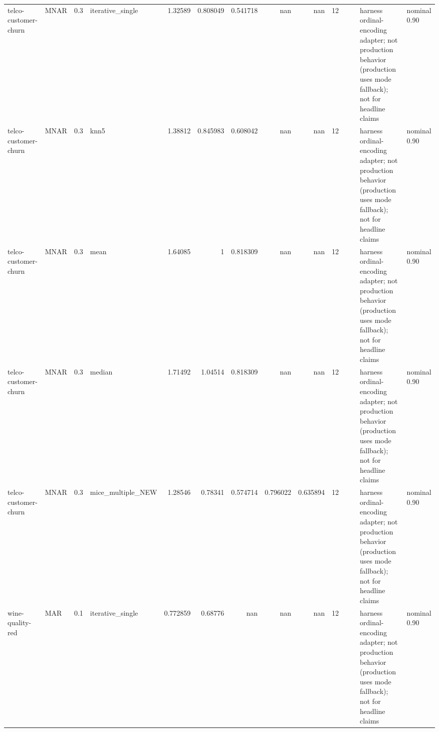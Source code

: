 \begin{table}[ht]
\begin{tabular}{llrlrrrrrrllll}
 telco-customer-churn & MNAR        &         0.3 & iterative\_single  &       1.32589  &             0.808049 &                 0.541718 &                     nan        &                       nan        &        12 &                    &                                         & harness ordinal-encoding adapter; not production behavior (production uses mode fallback); not for headline claims & nominal 0.90              \\
 telco-customer-churn & MNAR        &         0.3 & knn5              &       1.38812  &             0.845983 &                 0.608042 &                     nan        &                       nan        &        12 &                    &                                         & harness ordinal-encoding adapter; not production behavior (production uses mode fallback); not for headline claims & nominal 0.90              \\
 telco-customer-churn & MNAR        &         0.3 & mean              &       1.64085  &             1        &                 0.818309 &                     nan        &                       nan        &        12 &                    &                                         & harness ordinal-encoding adapter; not production behavior (production uses mode fallback); not for headline claims & nominal 0.90              \\
 telco-customer-churn & MNAR        &         0.3 & median            &       1.71492  &             1.04514  &                 0.818309 &                     nan        &                       nan        &        12 &                    &                                         & harness ordinal-encoding adapter; not production behavior (production uses mode fallback); not for headline claims & nominal 0.90              \\
 telco-customer-churn & MNAR        &         0.3 & mice\_multiple\_NEW &       1.28546  &             0.78341  &                 0.574714 &                       0.796022 &                         0.635894 &        12 &                    &                                         & harness ordinal-encoding adapter; not production behavior (production uses mode fallback); not for headline claims & nominal 0.90              \\
 wine-quality-red     & MAR         &         0.1 & iterative\_single  &       0.772859 &             0.68776  &               nan        &                     nan        &                       nan        &        12 &                    &                                         & harness ordinal-encoding adapter; not production behavior (production uses mode fallback); not for headline claims & nominal 0.90              \\

\end{tabular}
\end{table}
